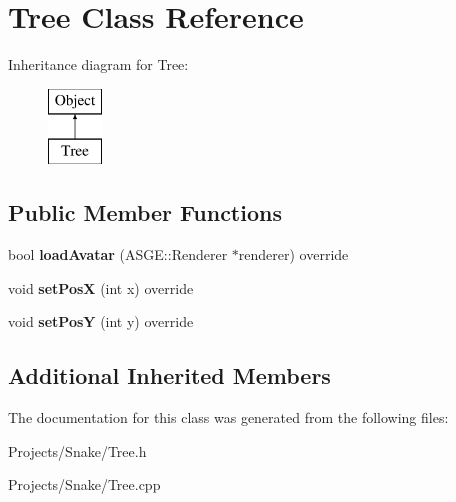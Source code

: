 \hypertarget{class_tree}{}\section{Tree Class Reference}
\label{class_tree}
Inheritance diagram for Tree\+:\begin{figure}[H]
\begin{center}
\leavevmode
\includegraphics[height=2.000000cm]{class_tree}
\end{center}
\end{figure}
\subsection*{Public Member Functions}
\begin{DoxyCompactItemize}
\item 
\mbox{\label{class_tree_add744007ad5d66dabbafa09098712be0}} 
bool {\bfseries load\+Avatar} (A\+S\+G\+E\+::\+Renderer $\ast$renderer) override
\item 
\mbox{\label{class_tree_a549c45a5f0414aa7d7ccccfdda572966}} 
void {\bfseries set\+PosX} (int x) override
\item 
\mbox{\label{class_tree_a5a79c7eeabb3785cc6a0d441be0732da}} 
void {\bfseries set\+PosY} (int y) override
\end{DoxyCompactItemize}
\subsection*{Additional Inherited Members}


The documentation for this class was generated from the following files\+:\begin{DoxyCompactItemize}
\item 
Projects/\+Snake/Tree.\+h\item 
Projects/\+Snake/Tree.\+cpp\end{DoxyCompactItemize}
